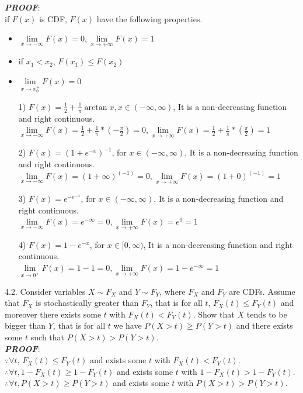 \documentclass{article}
\theoremstyle{definition}
\theoremstyle{definition}
\theoremstyle{remark}
\begin{document}
\emph{\textbf{PROOF}}:\\
if $F(x)$ is CDF, $F(x)$ have the following properties.
\begin{itemize}
\item $\lim\limits_{x \to -\infty }{F(x)} = 0, \lim\limits_{x \to +\infty }{F(x)} = 1$
\item if $x_1<x_2$, $F(x_1)\leq F(x_2)$
\item $\lim\limits_{x \to x_0^+}{F(x)} = 0$
\end{itemize}

\begin{enumerate}
\item[1)] $F(x)=\frac 1 2 + \frac 1 \pi \arctan x, x\in(-\infty,\infty)$, It is a non-decreasing function and right continuous.\\
$\lim\limits_{x \to -\infty }{F(x)} =\frac{1}{2}+\frac{1}{\pi}*(-\frac{\pi}{2})= 0, \lim\limits_{x \to +\infty }{F(x)} =\frac{1}{2}+\frac{1}{\pi}*(\frac{\pi}{2})= 1$
\item[2)] $F(x)=(1+e^{-x})^{-1}$, for $x\in(-\infty,\infty)$, It is a non-decreasing function and right continuous.\\
$\lim\limits_{x \to -\infty }{F(x)} =(1+\infty)^(-1)= 0, \lim\limits_{x \to +\infty }{F(x)} =(1+0)^(-1)= 1$
\item[3)] $F(x)=e^{-e^{-x}}$, for $x\in(-\infty,\infty)$, It is a non-decreasing function and right continuous.\\
$\lim\limits_{x \to -\infty }{F(x)} =e^{-\infty}= 0, \lim\limits_{x \to +\infty }{F(x)} =e^{0}= 1$
\item[4)] $F(x)=1-e^{-x}$, for $x\in[0,\infty)$, It is a non-decreasing function and right continuous.\\
$\lim\limits_{x \to 0^+ }{F(x)} =1-1= 0, \lim\limits_{x \to +\infty }{F(x)} =1-e^{-\infty}= 1$
\end{enumerate}

4.2. Consider variables $X\sim F_X$ and $Y\sim F_Y$, where $F_X$ and $F_Y$ are CDFs. Assume that $F_X$ is stochastically greater than $F_Y$, that is for all $t$,
$F_X(t) \leq F_Y(t)$ and moreover there exists some $t$ with $F_X(t) < F_Y(t)$. Show that $X$ tends to be bigger than $Y$, that is
for all $t$ we have $P(X>t)\geq P(Y>t)$ and there exists some $t$ such that $P(X>t)> P(Y>t)$.\\
\emph{\textbf{PROOF}}:\\
$\because \forall t$, $F_X(t) \leq F_Y(t)$ and exists some $t$ with $F_X(t) < F_Y(t)$.\\
$\therefore \forall t, 1- F_X(t) \geq 1-F_Y(t)$ and exists some $t$ with $1-F_X(t) > 1-F_Y(t)$.\\
$\therefore \forall t, P(X>t) \geq P(Y>t)$ and exists some $t$ with $P(X>t) > P(Y>t)$.\\
\end{document}

